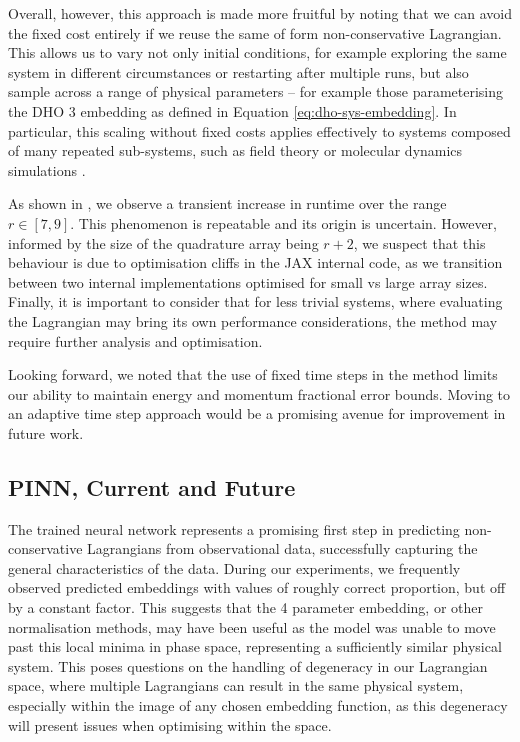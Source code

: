 Overall, however, this approach is made more fruitful by noting that we can avoid the fixed cost entirely if we reuse the same of form non-conservative Lagrangian.
This allows us to vary not only initial conditions, for example exploring the same system in different circumstances or restarting after multiple runs, but also sample across a range of physical parameters -- for example those parameterising the DHO 3 embedding as defined in Equation \eqref{eq:dho-sys-embedding}.
In particular, this scaling without fixed costs applies effectively to systems composed of many repeated sub-systems, such as field theory or molecular dynamics simulations \cite{tuckermanUnderstandingModernMolecular2000b}.

As shown in , we observe a transient increase in runtime over the range $r \in [7, 9]$. This phenomenon is repeatable and its origin is uncertain. However, informed by the size of the quadrature array being $r + 2$, we suspect that this behaviour is due to optimisation cliffs in the JAX internal code, as we transition between two internal implementations optimised for small vs large array sizes. Finally, it is important to consider that for less trivial systems, where evaluating the Lagrangian may bring its own performance considerations, the method may require further analysis and optimisation.

Looking forward, we noted that the use of fixed time steps in the method limits our ability to maintain energy and momentum fractional error bounds. Moving to an adaptive time step approach would be a promising avenue for improvement in future work.

\subsection{PINN, Current and Future}

The trained neural network represents a promising first step in predicting non-conservative Lagrangians from observational data, successfully capturing the general characteristics of the data.
During our experiments, we frequently observed predicted embeddings with values of roughly correct proportion, but off by a constant factor.
This suggests that the 4 parameter embedding, or other normalisation methods, may have been useful as the model was unable to move past this local minima in phase space, representing a sufficiently similar physical system.
This poses questions on the handling of degeneracy in our Lagrangian space, where multiple Lagrangians can result in the same physical system, especially within the image of any chosen embedding function, as this degeneracy will present issues when optimising within the space.

